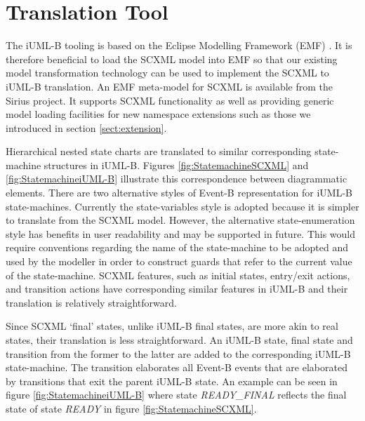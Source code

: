 
\section{Translation Tool}

The iUML-B tooling is based on the Eclipse Modelling Framework (EMF) \cite{steinberg2009emf}. 
It is therefore beneficial to load the SCXML model into EMF so that 
our existing model transformation technology can be used to 
implement the SCXML to iUML-B translation. An EMF meta-model for SCXML 
is available from the Sirius \cite{siriuswebsite}
project. It supports SCXML functionality as well as providing generic model
loading facilities for new namespace extensions such as those we 
introduced in section \ref{sect:extension}.

Hierarchical nested state charts are translated to similar corresponding  state-machine structures in iUML-B.  
Figures \ref{fig:StatemachineSCXML} and \ref{fig:StatemachineiUML-B} illustrate this correspondence between diagrammatic elements. 
There are two alternative styles of 
Event-B representation for iUML-B state-machines.  Currently the state-variables 
style is adopted because it is simpler to translate from the SCXML model. 
However, the alternative state-enumeration style has benefits in user readability 
and may be supported in future. This would  require conventions regarding 
the name of the state-machine  to be adopted and used by the modeller in order 
to construct guards that refer to the current value of the state-machine.
SCXML features, such as initial states, entry/exit actions, and transition 
actions have corresponding similar features in iUML-B and their translation 
is relatively straightforward. 

Since SCXML `final' states, unlike iUML-B  final states, are more akin to real states, their translation is less straightforward. 
An iUML-B state, final state and transition from the former to the latter are  added to the corresponding iUML-B state-machine. 
The transition elaborates  all Event-B events that are elaborated by transitions that exit the parent  iUML-B state. 
An example can be seen in figure \ref{fig:StatemachineiUML-B} where state \emph{READY\_FINAL} reflects the final state of state \emph{READY} in figure \ref{fig:StatemachineSCXML}.

